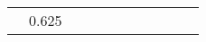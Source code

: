 \documentclass[a4paper]{llncs}
\begin{document}
\begin{table}[t]
{\begin{tabular}{ccccccccccc}
{{{{{     \textsl{Surveyunbias} & 0.625  {%
    \bottomrule
    \end{tabular}}
    \label{tab:pruning}
\end{table}
\end{document}
